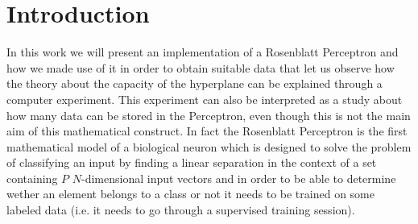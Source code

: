 \section{Introduction}
\label{sec:introduction}

In this work we will present an implementation of a Rosenblatt Perceptron \cite{rosenblatt1958perceptron}
and how we made use of it in order to obtain suitable data that let us observe how the theory about the capacity of the
hyperplane can be explained through a computer experiment. This experiment can also be interpreted as a study about how many
data can be stored in the Perceptron, even though this is not the main aim of this mathematical construct.
In fact the Rosenblatt Perceptron is the first mathematical model of a biological neuron which is designed to
solve the problem of classifying an input by finding a linear separation in the context of a set containing $P$ $N$-dimensional input vectors
and in order to be able to determine wether an element belongs to a class or not it needs to be trained on some labeled data
(i.e. it needs to go through a supervised training session).